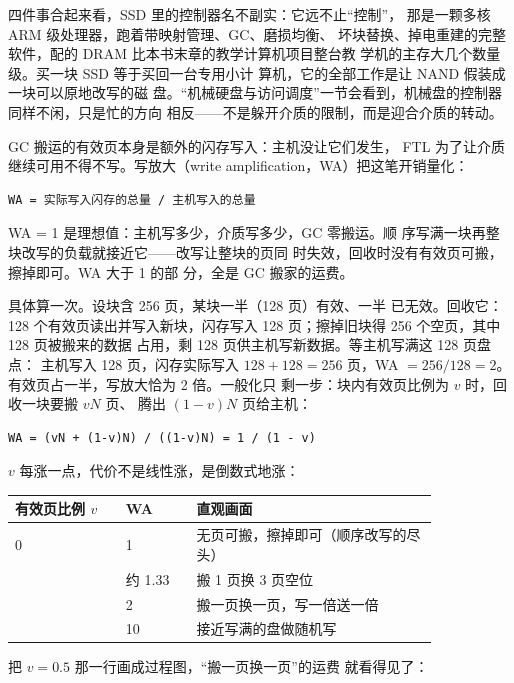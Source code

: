四件事合起来看，SSD 里的控制器名不副实：它远不止“控制”，
那是一颗多核 ARM 级处理器，跑着带映射管理、GC、磨损均衡、
坏块替换、掉电重建的完整软件，配的 DRAM 比本书末章的教学计算机项目整台教
学机的主存大几个数量级。买一块 SSD 等于买回一台专用小计
算机，它的全部工作是让 NAND 假装成一块可以原地改写的磁
盘。“机械硬盘与访问调度”一节会看到，机械盘的控制器同样不闲，只是忙的方向
相反——不是躲开介质的限制，而是迎合介质的转动。

GC 搬运的有效页本身是额外的闪存写入：主机没让它们发生，
FTL 为了让介质继续可用不得不写。写放大（write
amplification，WA）把这笔开销量化：

\begin{lstlisting}
WA = 实际写入闪存的总量 / 主机写入的总量
\end{lstlisting}

WA = 1 是理想值：主机写多少，介质写多少，GC 零搬运。顺
序写满一块再整块改写的负载就接近它——改写让整块的页同
时失效，回收时没有有效页可搬，擦掉即可。WA 大于 1 的部
分，全是 GC 搬家的运费。

具体算一次。设块含 256 页，某块一半（128 页）有效、一半
已无效。回收它：128 个有效页读出并写入新块，闪存写入
128 页；擦掉旧块得 256 个空页，其中 128 页被搬来的数据
占用，剩 128 页供主机写新数据。等主机写满这 128 页盘点：
主机写入 128 页，闪存实际写入 $128+128=256$ 页，WA
$=256/128=2$。有效页占一半，写放大恰为 2 倍。一般化只
剩一步：块内有效页比例为 $v$ 时，回收一块要搬 $vN$ 页、
腾出 $(1-v)N$ 页给主机：

\begin{lstlisting}
WA = (vN + (1-v)N) / ((1-v)N) = 1 / (1 - v)
\end{lstlisting}

$v$ 每涨一点，代价不是线性涨，是倒数式地涨：

\begin{longtable}{L{0.22\linewidth}L{0.14\linewidth}L{0.48\linewidth}}
\toprule
有效页比例 $v$ & WA & 直观画面 \\
 & 1 & 无页可搬，擦掉即可（顺序改写的尽头） \\ & 约 1.33 & 搬 1 页换 3 页空位 \\ & 2 & 搬一页换一页，写一倍送一倍 \\ & 10 & 接近写满的盘做随机写 \\
\bottomrule
\end{longtable}

把 $v=0.5$ 那一行画成过程图，“搬一页换一页”的运费
就看得见了：

